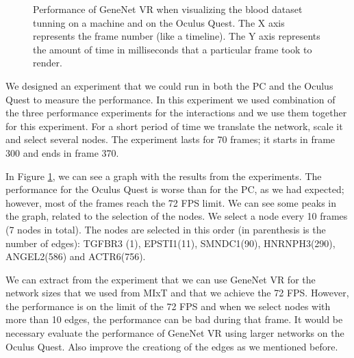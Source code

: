 \begin{figure}[h!]
  \centering
  \begin{minipage}{.8\textwidth}
  \end{minipage}
\caption{Performance of GeneNet VR when visualizing the blood dataset tunning on a machine and on the Oculus Quest. The X axis represents the frame number (like a timeline). The Y axis represents the amount of time in milliseconds that a particular frame took to render.}
\label{fig:pc_vs_oculus}
\end{figure}

We designed an experiment that we could run in both the PC and the Oculus Quest to measure the performance. In this experiment we used combination of the three performance experiments for the interactions and we use them together for this experiment. For a short period of time we translate the network, scale it and select several nodes. The experiment lasts for 70 frames; it starts in frame 300 and ends in frame 370.

In Figure \ref{fig:pc_vs_oculus}, we can see a graph with the results from the experiments. The performance for the Oculus Quest is worse than for the PC, as we had expected; however, most of the frames reach the 72 FPS limit. We can see some peaks in the graph, related to the selection of the nodes. We select a node every 10 frames (7 nodes in total). The nodes are selected in this order (in parenthesis is the number of edges): TGFBR3 (1), EPSTI1(11), SMNDC1(90), HNRNPH3(290), ANGEL2(586) and ACTR6(756).

We can extract from the experiment that we can use GeneNet VR for the network sizes that we used from MIxT and that we achieve the 72 FPS. However, the performance is on the limit of the 72 FPS and when we select nodes with more than 10 edges, the performance can be bad during that frame. It would be necessary evaluate the performance of GeneNet VR using larger networks on the Oculus Quest. Also improve the creationg of the edges as we mentioned before.


